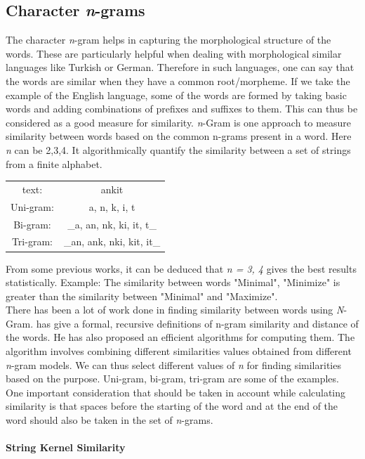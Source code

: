 \subsection{Character \textit{n}-grams}
The character \textit{n}-gram helps in capturing the morphological structure of the words. These are particularly helpful when dealing with morphological similar languages like Turkish or German. Therefore in such languages, one can say that the words are similar when they have a common root/morpheme. If we take the example of the English language, some of the words are formed by taking basic words and adding combinations of prefixes and suffixes to them. This can thus be considered as a good measure for similarity. 
\textit{n}-Gram is one approach to measure similarity between words  based on the common n-grams present in a word. Here \textit{n} can be 2,3,4. It algorithmically quantify the similarity between a set of strings from a finite alphabet. 
\begin{center}
	\begin{tabular}{ c c }
		text:& ankit\\
		Uni-gram:& a, n, k, i, t\\
		Bi-gram:&  \_a, an, nk, ki, it, t\_ \\
		Tri-gram:& \_an, ank, nki, kit, it\_ \\
	\end{tabular}
\end{center}
From some previous works, it can be deduced that \textit{n = 3, 4} gives the best results statistically. Example: The similarity between words "Minimal", "Minimize" is greater than the similarity between "Minimal" and "Maximize".\\
There has been a lot of work done in finding similarity between words using \textit{N}-Gram. \cite{kondrak2005n} has give a formal, recursive definitions of n-gram similarity and distance of the words. He has also proposed an efficient algorithms for computing them. The algorithm involves combining different similarities values obtained from different \textit{n}-gram models. 
We can thus select different values of \textit{n} for finding similarities based on the purpose. Uni-gram, bi-gram, tri-gram are some of the examples. One important consideration  that should be taken in account while calculating similarity is that spaces before the starting of the word and at the end of the word should also be taken in the set of \textit{n}-grams.\\
\\
\textbf{String Kernel Similarity}

